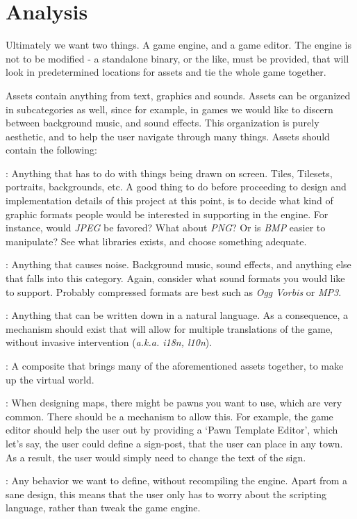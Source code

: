 \section{Analysis}

Ultimately we want two things. A game engine, and a game editor. The engine is
not to be modified - a standalone binary, or the like, must be provided, that
will look in predetermined locations for assets and tie the whole game
together.

Assets contain anything from text, graphics and sounds. Assets can be organized
in subcategories as well, since for example, in games we would like to discern
between background music, and sound effects. This organization is purely
aesthetic, and to help the user navigate through many things. Assets should
contain the following:

\begin{description}
  : Anything that has to do with things being drawn on screen.
    Tiles, Tilesets, portraits, backgrounds, etc. A good thing to do before
    proceeding to design and implementation details of this project at this
    point, is to decide what kind of graphic formats people would be interested
    in supporting in the engine. For instance, would \textit{JPEG} be favored?
    What about \textit{PNG}? Or is \textit{BMP} easier to manipulate? See what
    libraries exists, and choose something adequate.

  : Anything that causes noise. Background music, sound effects, and
    anything else that falls into this category. Again, consider what sound
    formats you would like to support. Probably compressed formats are best such
    as \textit{Ogg Vorbis} or \textit{MP3}.

  : Anything that can be written down in a natural language. As a
    consequence, a mechanism should exist that will allow for multiple
    translations of the game, without invasive intervention (\textit{a.k.a.
    i18n, l10n}).

  : A composite that brings many of the aforementioned assets
    together, to make up the virtual world.

  : When designing maps, there might be pawns you want to
    use, which are very common. There should be a mechanism to allow this. For
    example, the game editor should help the user out by providing a `Pawn
    Template Editor', which let's say, the user could define a sign-post, that
    the user can place in any town. As a result, the user would simply need to
    change the text of the sign.

  : Any behavior we want to define, without recompiling the
    engine. Apart from a sane design, this means that the user only has to worry
    about the scripting language, rather than tweak the game engine.
\end{description}

